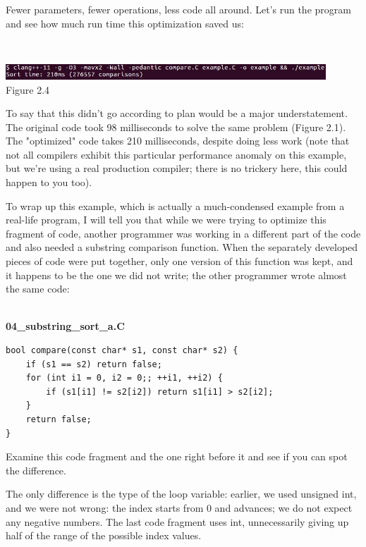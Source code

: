 Fewer parameters, fewer operations, less code all around. Let's run the program and see how much run time this optimization saved us:

\hspace*{\fill} \\ %
\begin{center}
\includegraphics[width=0.9\textwidth]{content/1/chapter2/images/4.jpg}\\
Figure 2.4
\end{center}

To say that this didn't go according to plan would be a major understatement. The original code took 98 milliseconds to solve the same problem (Figure 2.1). The "optimized" code takes 210 milliseconds, despite doing less work (note that not all compilers exhibit this particular performance anomaly on this example, but we're using a real production compiler; there is no trickery here, this could happen to you too).

To wrap up this example, which is actually a much-condensed example from a real-life program, I will tell you that while we were trying to optimize this fragment of code, another programmer was working in a different part of the code and also needed a substring comparison function. When the separately developed pieces of code were put together, only one version of this function was kept, and it happens to be the one we did not write; the other programmer wrote almost the same code:

\hspace*{\fill} \\ %
\noindent
\textbf{04\_substring\_sort\_a.C}
\begin{lstlisting}[style=styleCXX]
bool compare(const char* s1, const char* s2) {
	if (s1 == s2) return false;
	for (int i1 = 0, i2 = 0;; ++i1, ++i2) {
		if (s1[i1] != s2[i2]) return s1[i1] > s2[i2];
	}
	return false;
}
\end{lstlisting}

Examine this code fragment and the one right before it and see if you can spot the difference.

The only difference is the type of the loop variable: earlier, we used unsigned int, and we were not wrong: the index starts from 0 and advances; we do not expect any negative numbers. The last code fragment uses int, unnecessarily giving up half of the range of the possible index values.

